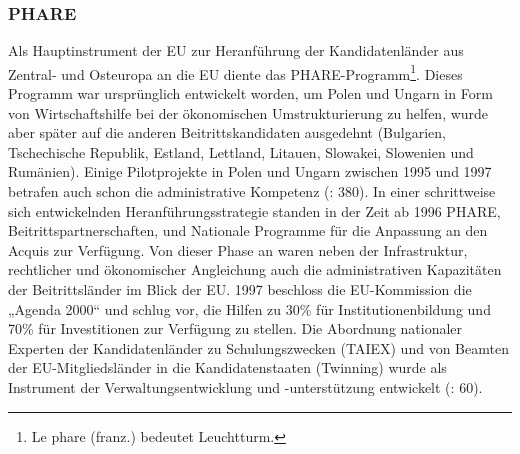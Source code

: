 \subsubsection{PHARE}
Als Hauptinstrument der EU zur Heranführung der Kandidatenländer aus Zentral- und Osteuropa an die EU diente das PHARE-Programm\footnote{Le phare (franz.) bedeutet Leuchtturm.}. Dieses Programm war ursprünglich entwickelt worden, um Polen und Ungarn in Form von Wirtschaftshilfe bei der ökonomischen Umstrukturierung zu helfen, wurde aber später auf die anderen Beitrittskandidaten ausgedehnt (Bulgarien, Tschechische Republik, Estland, Lettland, Litauen, Slowakei, Slowenien und Rumänien). Einige Pilotprojekte in Polen und Ungarn zwischen 1995 und 1997 betrafen auch schon die administrative Kompetenz (\cite{tomtul}: 380). In einer schrittweise sich entwickelnden Heranführungsstrategie standen in der Zeit ab 1996 PHARE, Beitrittspartnerschaften, und Nationale Programme für die Anpassung an den Acquis zur Verfügung. Von dieser Phase an waren neben der Infrastruktur, rechtlicher und ökonomischer Angleichung auch die administrativen Kapazitäten der Beitrittsländer im Blick der EU. 1997 beschloss die EU-Kommission die „Agenda 2000“ und schlug vor, die Hilfen zu 30\% für Institutionenbildung und 70\% für Investitionen zur Verfügung zu stellen. Die Abordnung nationaler Experten der Kandidatenländer zu Schulungszwecken (TAIEX) und von Beamten der EU-Mitgliedsländer in die Kandidatenstaaten (Twinning) wurde als Instrument der Verwaltungsentwicklung und -unterstützung entwickelt (\cite{lipumb04}: 60).\par

